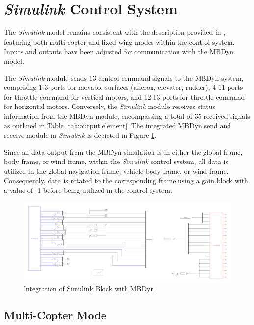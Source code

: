 \section{\textit{Simulink} Control System}

The \textit{Simulink} model remains consistent with the description provided in \cite{battaini2022}, featuring both multi-copter and fixed-wing modes within the control system. Inputs and outputs have been adjusted for communication with the MBDyn model.

The \textit{Simulink} module sends 13 control command signals to the MBDyn system, comprising 1-3 ports for movable surfaces (aileron, elevator, rudder), 4-11 ports for throttle command for vertical motors, and 12-13 ports for throttle command for horizontal motors. Conversely, the \textit{Simulink} module receives status information from the MBDyn module, encompassing a total of 35 received signals as outlined in Table \ref{tab:output element}. The integrated MBDyn send and receive module in \textit{Simulink} is depicted in Figure \ref{fig:Simulink_Block_connect_with_MBDyn}.

Since all data output from the MBDyn simulation is in either the global frame, body frame, or wind frame, within the \textit{Simulink} control system, all data is utilized in the global navigation frame, vehicle body frame, or wind frame. Consequently, data is rotated to the corresponding frame using a gain block with a value of -1 before being utilized in the control system.

\begin{figure}
  \centering
  \includegraphics[width=1\linewidth]{Images/airframe.png}
  \caption{Integration of Simulink Block with MBDyn}
  \label{fig:Simulink_Block_connect_with_MBDyn}
\end{figure}

\subsection{Multi-Copter Mode}

